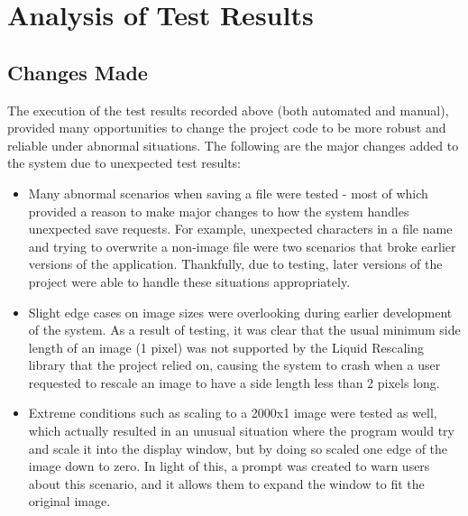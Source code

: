 \documentclass{article}
\begin{document}
\section{Analysis of Test Results}
\subsection{Changes Made}
The execution of the test results recorded above (both automated and manual), provided many opportunities to change the project code to be more robust and reliable under abnormal situations. The following are the major changes added to the system due to unexpected test results:
\begin{itemize}
    \item Many abnormal scenarios when saving a file were tested - most of which provided a reason to make major changes to how the system handles unexpected save requests. For example, unexpected characters in a file name and trying to overwrite a non-image file were two scenarios that broke earlier versions of the application. Thankfully, due to testing, later versions of the project were able to handle these situations appropriately.
    \item Slight edge cases on image sizes were overlooking during earlier development of the system. As a result of testing, it was clear that the usual minimum side length of an image (1 pixel) was not supported by the Liquid Rescaling library that the project relied on, causing the system to crash when a user requested to rescale an image to have a side length less than 2 pixels long.
    \item Extreme conditions such as scaling to a 2000x1 image were tested as well, which actually resulted in an unusual situation where the program would try and scale it into the display window, but by doing so scaled one edge of the image down to zero. In light of this, a prompt was created to warn users about this scenario, and it allows them to expand the window to fit the original image.
\end{itemize}
\end{document}
